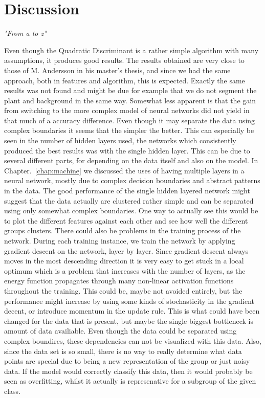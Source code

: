 \chapter{Discussion}
\begin{center}
\vspace{-6ex}
\textit{"From a to z"}
\vspace{6ex}
\end{center}

Even though the Quadratic Discriminant is a rather simple algorithm with many assumptions, it produces good results. The results obtained are very close to those of M. Andersson in his master's thesis, and since we had the same approach, both in features and algorithm, this is expected. Exactly the same results was not found and might be due for example that we do not segment the plant and background in the same way. Somewhat less apparent is that the gain from switching to the more complex model of neural networks did not yield in that much of a accuracy difference. Even though it may separate the data using complex boundaries it seems that the simpler the better. This can especially be seen in the number of hidden layers used, the networks which consistently produced the best results was with the single hidden layer. This can be due to several different parts, for depending on the data itself and also on the model. In Chapter.~\ref{chap:machine} we discussed the uses of having multiple layers in a neural network, mostly due to complex decision boundaries and abstract patterns in the data. The good performance of the single hidden layered network might suggest that the data actually are clustered rather simple and can be separated using only somewhat complex boundaries. One way to actually see this would be to plot the different features against each other and see how well the different groups clusters. There could also be problems in the training process of the network. During each training instance, we train the network by applying gradient descent on the network, layer by layer. Since gradient descent always moves in the most descending direction it is very easy to get stuck in a local optimum which is a problem that increases with the number of layers, as the energy function propagates through many non-linear activation functions throughout the training. This could be, maybe not avoided entirely, but the performance might increase by using some kinds of stochasticity in the gradient decent, or introduce momentum in the update rule. This is what could have been changed for the data that is present, but maybe the single biggest bottleneck is amount of data availiable. Even though the data could be separated using complex boundires, these dependencies can not be visualized with this data. Also, since the data set is so small, there is no way to really determine what data points are special due to being a new representation of the group or just noisy data. If the model would correctly classify this data, then it would probably be seen as overfitting, whilst it actually is represenative for a subgroup of the given class.  \\

